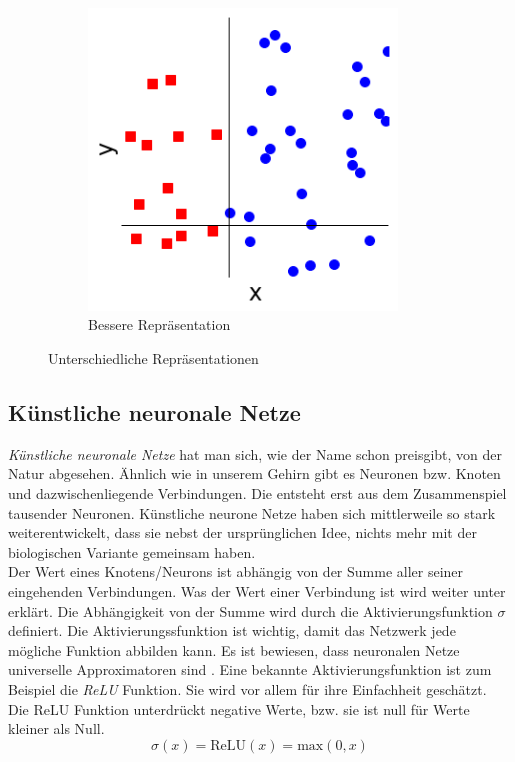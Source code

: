 \begin{figure}[hbt]
\begin{subfigure}{0.3\textwidth}
	\end{subfigure}
	\begin{subfigure}{0.3\textwidth}
		\includegraphics[width=0.9\textwidth]{assets/repr_2.png}
		\caption{Bessere Repräsentation}
	\end{subfigure}
	\caption{Unterschiedliche Repräsentationen}
	\label{img:repr}
\end{figure}

\subsection{Künstliche neuronale Netze}

\textit{Künstliche neuronale Netze} hat man sich, wie der Name schon preisgibt, von der Natur abgesehen. Ähnlich wie in unserem Gehirn gibt es Neuronen bzw. Knoten und dazwischenliegende Verbindungen. Die  entsteht erst aus dem Zusammenspiel tausender Neuronen. Künstliche neurone Netze haben sich mittlerweile so stark weiterentwickelt, dass sie nebst der ursprünglichen Idee, nichts mehr mit der biologischen Variante gemeinsam haben. \\

Der Wert eines Knotens/Neurons ist abhängig von der Summe aller seiner eingehenden Verbindungen. Was der Wert einer Verbindung ist wird weiter unter erklärt. Die Abhängigkeit von der Summe wird durch die Aktivierungsfunktion $\sigma$ definiert. Die Aktivierungssfunktion ist wichtig, damit das Netzwerk jede mögliche Funktion abbilden kann. Es ist bewiesen, dass neuronalen Netze universelle Approximatoren sind \parencite[][Kap. 4]{universal}. Eine bekannte Aktivierungsfunktion ist zum Beispiel die \textit{ReLU} Funktion. Sie wird vor allem für ihre Einfachheit geschätzt. Die ReLU Funktion unterdrückt negative Werte, bzw. sie ist null für Werte kleiner als Null. \parencite[vgl.][]{neuronale_netze}  \parencite[vgl.][]{chollet}
$$\sigma(x) = \text{ReLU}(x) = \text{max}(0, x)$$

